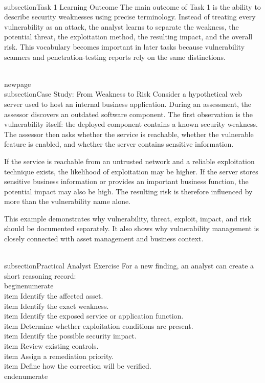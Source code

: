 \documentclass[11pt,a4paper]{article}
\begin{document}
\\subsection{Task 1 Learning Outcome}
The main outcome of Task 1 is the ability to describe security weaknesses using precise terminology. Instead of treating every vulnerability as an attack, the analyst learns to separate the weakness, the potential threat, the exploitation method, the resulting impact, and the overall risk. This vocabulary becomes important in later tasks because vulnerability scanners and penetration-testing reports rely on the same distinctions.

\\newpage
\\subsection{Case Study: From Weakness to Risk}
Consider a hypothetical web server used to host an internal business application. During an assessment, the assessor discovers an outdated software component. The first observation is the vulnerability itself: the deployed component contains a known security weakness. The assessor then asks whether the service is reachable, whether the vulnerable feature is enabled, and whether the server contains sensitive information.

If the service is reachable from an untrusted network and a reliable exploitation technique exists, the likelihood of exploitation may be higher. If the server stores sensitive business information or provides an important business function, the potential impact may also be high. The resulting risk is therefore influenced by more than the vulnerability name alone.

This example demonstrates why vulnerability, threat, exploit, impact, and risk should be documented separately. It also shows why vulnerability management is closely connected with asset management and business context.

\\subsection{Practical Analyst Exercise}
For a new finding, an analyst can create a short reasoning record:
\\begin{enumerate}
\\item Identify the affected asset.
\\item Identify the exact weakness.
\\item Identify the exposed service or application function.
\\item Determine whether exploitation conditions are present.
\\item Identify the possible security impact.
\\item Review existing controls.
\\item Assign a remediation priority.
\\item Define how the correction will be verified.
\\end{enumerate}
\end{document}
